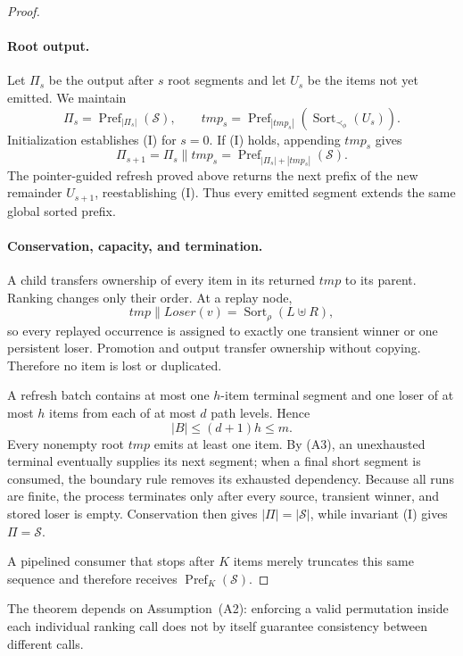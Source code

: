 \begin{proof}
\paragraph{Root output.}
Let $\Pi_s$ be the output after $s$ root segments and let $U_s$ be the
items not yet emitted. We maintain
\[
  \Pi_s=\operatorname{Pref}_{|\Pi_s|}(\mathcal S),
  \qquad
  tmp_s=
  \operatorname{Pref}_{|tmp_s|}
  \left(\operatorname{Sort}_{\prec_\phi}(U_s)\right).
  \tag{I}
\]
Initialization establishes (I) for $s=0$. If (I) holds, appending
$tmp_s$ gives
\[
  \Pi_{s+1}
  =\Pi_s\mathbin{\|}tmp_s
  =\operatorname{Pref}_{|\Pi_s|+|tmp_s|}(\mathcal S).
\]
The pointer-guided refresh proved above returns the next prefix of the
new remainder $U_{s+1}$, reestablishing (I). Thus every emitted segment
extends the same global sorted prefix.

\paragraph{Conservation, capacity, and termination.}
A child transfers ownership of every item in its returned $tmp$ to its
parent. Ranking changes only their order. At a replay node,
\[
  tmp\mathbin{\|}\mathit{Loser}(v)
  =\operatorname{Sort}_{\rho}(L\uplus R),
\]
so every replayed occurrence is assigned to exactly one transient winner
or one persistent loser. Promotion and output transfer ownership without
copying. Therefore no item is lost or duplicated.

A refresh batch contains at most one $h$-item terminal segment and one
loser of at most $h$ items from each of at most $d$ path levels. Hence
\begin{equation}
  |B|\le (d+1)h\le m.
  \label{eq:appendix-repair-capacity}
\end{equation}
Every nonempty root $tmp$ emits at least one item. By (A3), an
unexhausted terminal eventually supplies its next segment; when a final
short segment is consumed, the boundary rule removes its exhausted
dependency. Because all runs are finite, the process terminates only
after every source, transient winner, and stored loser is empty.
Conservation then gives $|\Pi|=|\mathcal S|$, while invariant (I) gives
$\Pi=\mathcal S$.

A pipelined consumer that stops after $K$ items merely truncates this
same sequence and therefore receives
$\operatorname{Pref}_K(\mathcal S)$.
\end{proof}

The theorem depends on Assumption~(A2): enforcing a valid permutation
inside each individual ranking call does not by itself guarantee
consistency between different calls.
